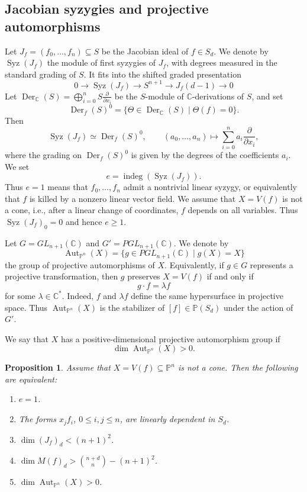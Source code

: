 \documentclass[11pt]{amsart}
\theoremstyle{plain}
\newtheorem{prop}[subsection]{Proposition}
\theoremstyle{definition}
\numberwithin{equation}{section}
\newcommand{\C}{\mathbb{C}}
\newcommand{\PP}{\mathbb{P}}
\DeclareMathOperator{\Aut}{Aut}
\begin{document}
\subsection{Jacobian syzygies and projective automorphisms}
Let $J_f=(f_0,\ldots,f_n)\subseteq S$ be the Jacobian ideal of $f\in S_d$. We denote by 
$\operatorname{Syz}(J_f)$ the module of first syzygies of $J_f$, with degrees measured in the standard
grading of $S$. It fits into the shifted graded presentation
\[
0\to \operatorname{Syz}(J_f)\to S^{n+1}\to J_f(d-1)\to 0
\]
Let
$
\operatorname{Der}_{\C}(S)=
\bigoplus_{i=0}^n S\frac{\partial}{\partial x_i}
$
be the $S$-module of $\C$-derivations of $S$, and set
\[
\operatorname{Der}_f(S)^0
=
\{\Theta\in \operatorname{Der}_{\C}(S)\mid \Theta(f)=0\}.
\]
Then
\[
\operatorname{Syz}(J_f)\simeq \operatorname{Der}_f(S)^0,
\qquad
(a_0,\ldots,a_n)\longmapsto
\sum_{i=0}^n a_i\frac{\partial}{\partial x_i},
\]
where the grading on $\operatorname{Der}_f(S)^0$ is given by the degrees of the
coefficients $a_i$. We set
\[
e=\operatorname{indeg}(\operatorname{Syz}(J_f)).
\]
Thus $e=1$ means that $f_0,\ldots,f_n$ admit a nontrivial linear syzygy, or
equivalently that $f$ is killed by a nonzero linear vector field.
We assume that $X=V(f)$ is not a cone, i.e., after a linear change of coordinates,
$f$ depends on all variables. Thus 
$\operatorname{Syz}(J_f)_0=0$ and hence $e\geq 1$.

Let $G=GL_{n+1}(\C)$ and $G'=PGL_{n+1}(\C)$. We denote by
\[
\Aut_{\PP^n}(X)
=
\{g\in PGL_{n+1}(\C)\mid g(X)=X\}
\]
the group of projective automorphisms of $X$. Equivalently, if $g\in G$
represents a projective transformation, then $g$ preserves $X=V(f)$ if and only if
\[
g\cdot f=\lambda f
\]
for some $\lambda\in \C^*$. Indeed, $f$ and $\lambda f$ define the same
hypersurface in projective space. Thus $\Aut_{\PP^n}(X)$ is the stabilizer of
$[f]\in \PP(S_d)$ under the action of $G'$.

We say that $X$ has a positive-dimensional projective automorphism group if
\[
\dim \Aut_{\PP^n}(X)>0.
\]

\begin{prop}
\label{prop:aut-syz}
Assume that $X=V(f)\subseteq \PP^n$ is not a cone. Then the following are equivalent:
\begin{enumerate}
\item $e=1$.
\item The forms $x_jf_i$, $0\leq i,j\leq n$, are linearly dependent in $S_d$.
\item $\dim (J_f)_d<(n+1)^2$.
\item $\dim M(f)_d>\binom{n+d}{n}-(n+1)^2$.
\item $\dim \Aut_{\PP^n}(X)>0$.
\end{enumerate}
\end{prop}
\end{document}
